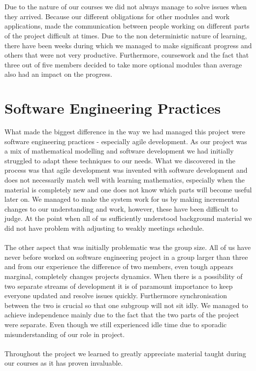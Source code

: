 \documentclass[10pt, a4paper]{report}
\begin{document}
\\\\
Due to the nature of our courses we did not always manage to solve issues when they arrived. Because our different obligations for other modules and work applications, made the communication between people working on different parts of the project difficult at times. Due to the non deterministic nature of learning, there have been weeks during which we managed to make significant progress and others that were not very productive. Furthermore, coursework and the fact that three out of five members decided to take more optional modules than average also had an impact on the progress.

\section{Software Engineering Practices}\label{sec:softeng}
What made the biggest difference in the way we had managed this project were software engineering practices - especially agile development. As our project was a mix of mathematical modelling and software development we had initially struggled to adapt these techniques to our needs. What we discovered in the process was that agile development was invented with software development and does not necessarily match well with learning mathematics, especially when the material is completely new and one does not know which parts will become useful later on. We managed to make the system work for us by making incremental changes to our understanding and work, however, these have been difficult to judge. At the point when all of us sufficiently understood background material we did not have problem with adjusting to weakly meetings schedule.
\\\\
The other aspect that was initially problematic was the group size. All of us have never before worked on software engineering project in a group larger than three and from our experience the difference of two members, even tough appears marginal, completely changes projects dynamics. When there is a possibility of two separate streams of development it is of paramount importance to keep everyone updated and resolve issues quickly. Furthermore synchronisation between the two is crucial so that one subgroup will not sit idly. We managed to achieve independence mainly due to the fact that the two parts of the project were separate. Even though we still experienced idle time due to sporadic misunderstanding of our role in project.
\\\\
Throughout the project we learned to greatly appreciate material taught during our courses as it has proven invaluable.
\end{document}
